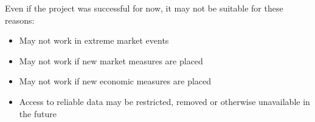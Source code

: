 Even if the project was successful for now, it may not be suitable for these reasons:
\begin{itemize}
    \item May not work in extreme market events
    \item May not work if new market measures are placed
    \item May not work if new economic measures are placed
    \item Access to reliable data may be restricted, removed or otherwise unavailable in the future
\end{itemize}
